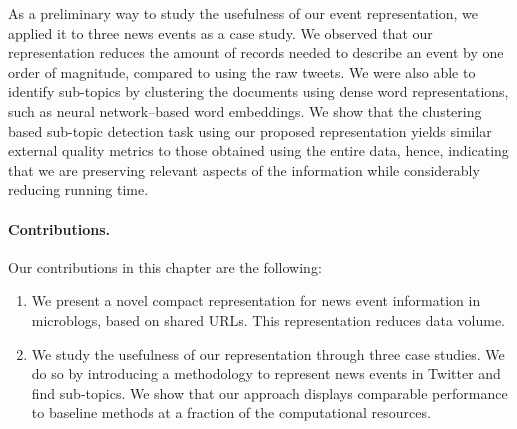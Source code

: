 As a preliminary way to study the usefulness of our event representation, we
applied it to three news events as a case study.
%
We observed that our representation reduces the amount of records needed to
describe an event by one order of magnitude, compared to using the raw tweets. 
%
We were also able to identify sub-topics by clustering the documents using dense
word representations, such as neural network--based word embeddings. 
%
We show that the clustering based sub-topic detection task using our proposed
representation yields similar external quality metrics to those obtained using
the entire data, 
%
hence, indicating that we are preserving relevant aspects of the information
while considerably reducing running time.

\paragraph{Contributions.} Our contributions in this chapter are the following:

\begin{enumerate}
  \item We present a novel compact representation for news event information in
  microblogs, based on shared URLs. This representation reduces data volume.

  \item We study the usefulness of our representation through three case
  studies. We do so by introducing a methodology to represent news events in
  Twitter and find sub-topics. We show that our approach displays comparable
  performance to baseline methods at a fraction of the computational resources.
\end{enumerate}




